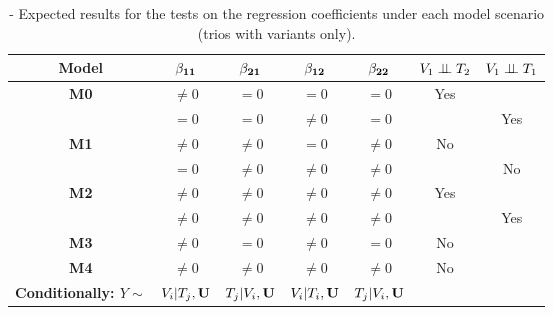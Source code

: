 \documentclass[12pt]{report}
\begin{document}
\begin{table}[H]
\centering
\caption{- Expected results for the tests on the regression coefficients under each model scenario (trios with variants only).}
\begin{tabular}{|c||cccc|c|c|}
\hline
\bf Model  & $\bf\beta_{11}$  &  $\bf\beta_{21}$   & $\bf\beta_{12}$    & $\bf\beta_{22}$    & $ V_1 \perp \!\!\! \perp T_2$    & $V_1 \perp \!\!\! \perp T_1$    \\ \hline \hline
\bf M0      &  $\neq 0$            & $= 0$                  & $=0$                    & $=0$                    & Yes                          &           \\ \hline 
               &  $= 0$                 & $= 0$                  & $\neq 0$                & $= 0$                  &                                & Yes           \\ \hline
\bf M1      &  $\neq 0$            &  $\neq 0$             & $= 0$                    & $\neq 0$              & No                            &            \\ \hline
               &  $ = 0$                &  $\neq0$              & $\neq0$                & $\neq 0$              &                                & No       \\ \hline
\bf M2      &   $\neq0$            &  $\neq 0$             & $\neq0$                & $\neq0$               & Yes                          &           \\ \hline
               &   $\neq0$            &  $\neq 0$             & $\neq0$                & $\neq0$               &                                & Yes          \\ \hline
\bf M3      &   $\neq 0$           &  $= 0$                 & $\neq0$                & $=0$                   & No                           &            \\ \hline
\bf M4      &   $\neq0$            &  $\neq 0$             & $\neq0$                & $\neq0$               & No                          &             \\ \hline \hline
\bf Conditionally:  $Y \sim$& $V_i|T_j,{\bf U}$  &  $T_j|V_i, {\bf U}$   & $V_i| T_i, {\bf U}$    & $T_j|V_i,{\bf U}$    &            \\ \hline 
\end{tabular}
\end{table}
\end{document}
